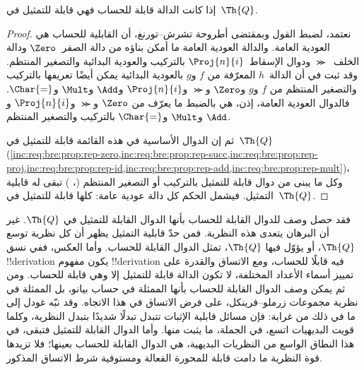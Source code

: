 \documentclass[../../../include/open-logic-section]{subfiles}
\begin{document}

\begin{thm}
إذا كانت الدالة قابلة للحساب فهي قابلة للتمثيل في~$\Th{Q}$.
\end{thm}

\begin{proof}
نعتمد، لضبط القول وبمقتضى أطروحة تشرش--تورنغ، أن القابلية للحساب
هي العودية العامة. والدالة العودية العامة ما أمكن بناؤه من دالة
الصفر~$\Zero$ ودالة الخلف~$\Succ$ ودوال الإسقاط~$\Proj{n}{i}$
بالتركيب والعودية البدائية والتصغير المنتظم.
وقد ثبت في  أن الدالة~$h$
المعرّفة من $f$ و$g$ بالعودية البدائية يمكن أيضًا تعريفها بالتركيب
والتصغير المنتظم من $f$ و$g$ و$\Zero$ و$\Succ$ و$\Proj{n}{i}$
و$\Add$ و$\Mult$ و$\Char{=}$.
فالدوال العودية العامة، إذن، هي بالضبط ما يعرّف من
$\Zero$ و$\Succ$ و$\Proj{n}{i}$ و$\Add$ و$\Mult$ و$\Char{=}$
بالتركيب والتصغير المنتظم.

ثم إن الدوال الأساسية في هذه القائمة قابلة للتمثيل في~$\Th{Q}$
(\cref{inc:req:bre:prop:rep-zero,inc:req:bre:prop:rep-succ,inc:req:bre:prop:rep-proj,inc:req:bre:prop:rep-id,inc:req:bre:prop:rep-add,inc:req:bre:prop:rep-mult})،
وكل ما يبنى من دوال قابلة للتمثيل بالتركيب أو التصغير المنتظم
(،
) تبقى له قابلية التمثيل.
فيشمل الحكم كل دالة عودية عامة: كلها قابلة للتمثيل في~$\Th{Q}$.
\end{proof}

\begin{explain}
فقد حصل وصف للدوال القابلة للحساب بأنها الدوال القابلة للتمثيل في
$\Th{Q}$. غير أن البرهان يتعدى هذه النظرية. فمن حدّ قابلية التمثيل
يظهر أن كل نظرية توسع $\Th{Q}$، أو يؤوّل فيها $\Th{Q}$، تمثل
الدوال القابلة للحساب.
وأما العكس، ففي نسق !!{derivation} يكون مفهوم !!{derivation} فيه
قابلًا للحساب، ومع الاتساق والقدرة على تمييز أسماء الأعداد المختلفة،
لا تكون الدالة قابلة للتمثيل إلا وهي قابلة للحساب.
ومن ثم يمكن وصف الدوال القابلة للحساب بأنها الممثلة في حساب بيانو،
بل الممثلة في نظرية مجموعات زرملو--فرينكل، على فرض الاتساق في هذا الاتجاه.
وقد نبّه غودل إلى ما في ذلك من غرابة: فإن مسائل قابلية الإثبات تتبدل
تبدلًا شديدًا بتبدل النظرية، وكلما قويت البديهيات اتسع، في الجملة، ما
يثبت منها. وأما الدوال القابلة للتمثيل فتبقى، في هذا النطاق الواسع من
النظريات البديهية، هي الدوال القابلة للحساب بعينها؛ فلا تزيدها قوة النظرية
ما دامت قابلة للمحورة الفعالة ومستوفية شرط الاتساق المذكور.
\end{explain}
\end{document}
